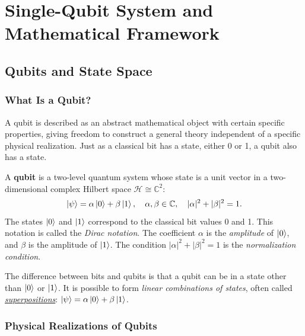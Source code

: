 \documentclass[10pt,a4paper]{article}
\begin{document}
\section{Single-Qubit System and Mathematical Framework}

\subsection{Qubits and State Space}

\subsubsection*{What Is a Qubit?}

A qubit is described as an abstract mathematical object with certain specific properties, giving freedom to construct a general theory independent of a specific physical realization. Just as a classical bit has a state, either 0 or 1, a qubit also has a state.

\begin{tcolorbox}[defstyle, title={Definition: Qubit}]
A \textbf{qubit} is a two-level quantum system whose state is a unit vector in a two-dimensional complex Hilbert space $\mathcal{H}\cong\mathbb{C}^2$:
\[
\ket{\psi} = \alpha\ket{0} + \beta\ket{1}, \quad \alpha,\beta\in\mathbb{C}, \quad |\alpha|^2 + |\beta|^2 = 1.
\]
The states $\ket{0}$ and $\ket{1}$ correspond to the classical bit values 0 and 1. This notation is called the \emph{Dirac notation}. The coefficient $\alpha$ is the \emph{amplitude} of $\ket{0}$, and $\beta$ is the amplitude of $\ket{1}$. The condition $|\alpha|^2+|\beta|^2=1$ is the \emph{normalization condition}.
\end{tcolorbox}

The difference between bits and qubits is that a qubit can be in a state other than $\ket{0}$ or $\ket{1}$. It is possible to form \emph{linear combinations of states}, often called \uline{\emph{superpositions}}: $\ket{\psi}=\alpha\ket{0}+\beta\ket{1}$.

\subsubsection*{Physical Realizations of Qubits}
\end{document}
